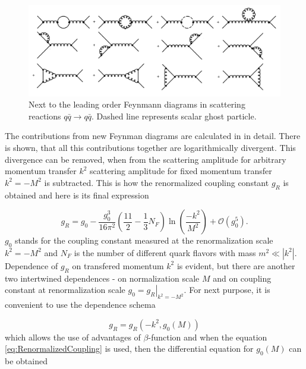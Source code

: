 \begin{figure}[t]
  \centering
  \includegraphics[width=\textwidth]{Chapter1/QuarkQuarkCorrection.png} 
  \caption{Next to the leading order Feynmann diagrams in scattering reactions
    $q \bar{q} \rightarrow q \bar{q}$. Dashed line represents scalar ghost
  particle.}
  \label{fig:QuarkQuarkScatteringCorrection}
\end{figure}

The contributions from new Feynman diagrams are calculated in \cite{QCDTextbook}
in detail. There is shown, that all this contributions together are
logarithmically divergent. This divergence can be removed, when from the scattering
amplitude for arbitrary momentum transfer $k^2$ scattering amplitude for fixed
momentum transfer $k^2 = -M^2$ is subtracted. This is how the renormalized
coupling constant $g_R$ is obtained and here is its final expression 

\begin{equation}
  g_R = g_0 - \frac{g_0^3}{16\pi^2} \left( \frac{11}{2} - \frac{1}{3}N_F \right)
  \ln \left( \frac{-k^2}{M^2} \right) + \mathscr{O}(g_0^5).
  \label{eq:RenormalizedCoupling}
\end{equation}
$g_0$ stands for the coupling constant measured at the renormalization scale
$k^2 = -M^2$ and $N_F$ is the number of different quark flavors with mass $m^2
\ll \left| k^2 \right|$. Dependence of $g_R$ on transfered momentum $k^2$ is
evident, but there are another two intertwined dependences - on normalization
scale $M$ and on coupling constant at renormalization scale $g_0 =
\left. g_R \right|_{k^2=-M^2}$. For next purpose, it is convenient to use the
dependence schema

\begin{equation}
  g_R = g_R(-k^2,g_0(M))
  \label{eq:RunningCouplingConstantDependenceSchema}
\end{equation}
which allows the use of advantages of $\beta$-function and when the equation
\eqref{eq:RenormalizedCoupling} is used, then the differential
equation for $g_0(M)$ can be obtained

